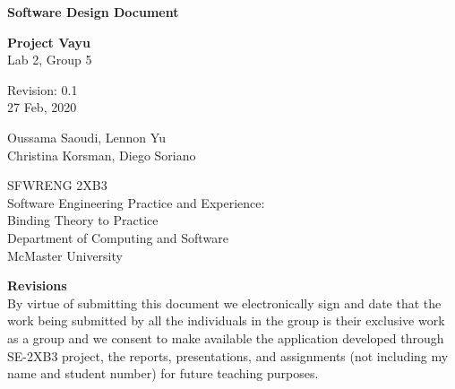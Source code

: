 \documentclass[12pt]{article}
\begin{document}
\begin{titlepage}
    \begin{center}
        \vspace*{1cm}
            
        \Huge
        \textbf{Software Design Document}

        \LARGE
        \vspace{0.5cm}
        \textbf{Project Vayu}\\
        \vspace{0.2cm}
        Lab 2, Group 5

        \vspace{0.5cm}
        Revision: 0.1\\
        \vspace{0.2cm}
        27 Feb, 2020
            
        \vspace{1.5cm}
            
        \Large
        Oussama Saoudi, Lennon Yu\\
        Christina Korsman, Diego Soriano

        \vfill
            
        \vspace{0.8cm}
                        
        \large
        SFWRENG 2XB3\\
        Software Engineering Practice and Experience:\\
        Binding Theory to Practice\\
        Department of Computing and Software\\
        McMaster University            
    \end{center}
\end{titlepage}

\newpage
\Large \noindent \textbf{Revisions}\\
\normalsize
By virtue of submitting this document we electronically sign and date
that the work being submitted by all the individuals in the group is
their exclusive work as a group and we consent to make available the
application developed through SE-2XB3 project, the reports,
presentations, and assignments (not including my name and student number)
for future teaching purposes. 

\newpage
\end{document}
